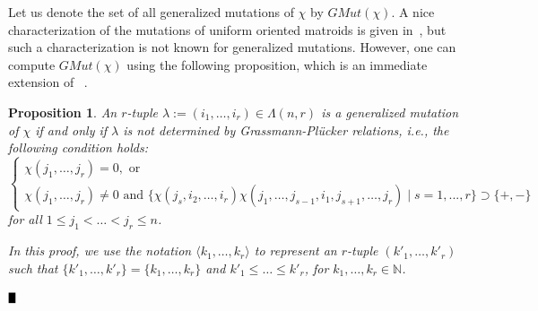 \documentclass{article}
\def\BBox{\rule{2mm}{3mm}}
\def\QED{\hfill$\BBox$}
\newenvironment{proof}
{\begin{rm}\par\smallskip\noindent{\bf Proof.}\quad}{\QED\end{rm}}
\newtheorem{prop}[thm]{\bfseries Proposition} %
\begin{document}
Let us denote the set of all generalized mutations of $\chi$ by $GMut(\chi )$.
A nice characterization of the mutations of uniform oriented matroids is given in~\cite[Theorem 3.4.]{RS88},
but such a characterization is not known for generalized mutations.
However, one can compute $GMut(\chi )$ using the following proposition, which is an immediate extension of ~\cite[Proposition 3.3.]{RS88}.
\begin{prop}
An $r$-tuple $\lambda :=(i_1,\dots,i_r) \in \Lambda (n,r)$ is a generalized mutation of $\chi$
if and only if $\lambda$ {\it is not determined by Grassmann-Pl\"ucker relations},
i.e., the following condition holds:
\begin{equation}
\label{Gmut_Grassmann}
\begin{cases}
\chi (j_{1},\dots, j_{r}) = 0, 
\text{ or } \\
\chi (j_{1},\dots, j_{r}) \neq 0 \text{ and }
\{ \chi (j_{s},i_{2},\dots, i_{r})\chi (j_{1},\dots, j_{s-1},i_{1},j_{s+1},\dots, j_{r}) \mid  s=1,...,r\} \supset \{ +,- \}
\end{cases}
\end{equation}
for all $1 \leq j_1 < \dots < j_r \leq n$.
\begin{proof} 
In this proof, we use the notation $\langle k_1,\dots,k_r \rangle$ to represent an $r$-tuple $(k'_1,\dots,k'_r)$ such that 
$\{ k'_1,\dots,k'_r\} = \{ k_1,\dots,k_r\}$
and $k'_1 \leq \dots \leq k'_r$, for $k_1,\dots,k_r \in \mathbb{N}$.


\end{proof}
\end{prop}
\end{document}
